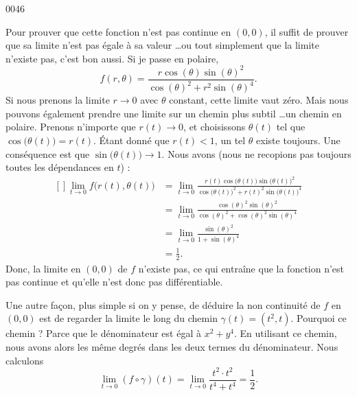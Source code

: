 
\begin{corrige}{0046}

Pour prouver que cette fonction n'est pas continue en $(0,0)$, il suffit de prouver que sa limite n'est pas égale à sa valeur \ldots ou tout simplement que la limite n'existe pas, c'est bon aussi. Si je passe en polaire,
\begin{equation}
	f(r,\theta)=\frac{ r\cos(\theta)\sin(\theta)^2 }{ \cos(\theta)^2+r^2\sin(\theta)^4 }.
\end{equation}
Si nous prenons la limite $r\to 0$ avec $\theta$ constant, cette limite vaut zéro. Mais nous pouvons également prendre une limite sur un chemin plus subtil \ldots un chemin en polaire. Prenons n'importe que $r(t)\to 0$, et choisissons $\theta(t)$ tel que $\cos\big( \theta(t) \big)=r(t)$. Étant donné que $r(t)<1$, un tel $\theta$ existe toujours. Une conséquence est que $\sin\big( \theta(t) \big)\to 1$. Nous avons (nous ne recopions pas toujours toutes les dépendances en $t$) :
\begin{equation}
	\begin{aligned}[]
		\lim_{t\to 0}f\big( r(t),\theta(t) \big)	&=\lim_{t\to 0}\frac{ r(t)\cos\big( \theta(t) \big)\sin\big( \theta(t) \big)^2 }{ \cos\big( \theta(t) \big)^2+r(t)^2\sin\big( \theta(t) \big)^4 }\\
		&=\lim_{t\to 0}\frac{ \cos(\theta)^2\sin(\theta)^2 }{ \cos(\theta)^2+\cos(\theta)^2\sin(\theta)^4 }\\
		&=\lim_{t\to 0}\frac{ \sin(\theta)^2 }{ 1+\sin(\theta)^4 }\\
		&=\frac{ 1 }{2}.
	\end{aligned}
\end{equation}
Donc, la limite en $(0,0)$ de $f$ n'existe pas, ce qui entraîne que la fonction n'est pas continue et qu'elle n'est donc pas différentiable.

Une autre façon, plus simple si on y pense, de déduire la non continuité de $f$ en $(0,0)$ est de regarder la limite le long du chemin $\gamma(t)=(t^2,t)$. Pourquoi ce chemin ? Parce que le dénominateur est égal à $x^2+y^4$. En utilisant ce chemin, nous avons alors les même degrés dans les deux termes du dénominateur. Nous calculons
\begin{equation}
	\lim_{t\to 0}(f\circ\gamma)(t)=\lim_{t\to 0}\frac{ t^2\cdot t^2 }{ t^4+t^4 }=\frac{1}{ 2 }.
\end{equation}


\end{corrige}
